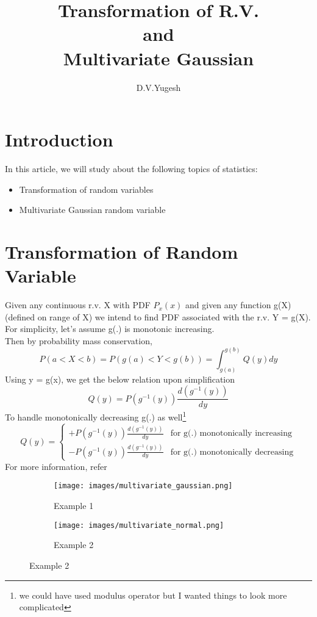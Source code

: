\documentclass{article}
\title{Transformation of R.V. \\ and \\ Multivariate Gaussian}
\author{D.V.Yugesh}
\date{}
\begin{document}
\maketitle
\tableofcontents
\clearpage
\section{Introduction}
In this article, we will study about the following topics of statistics:
\begin{itemize}
    \item Transformation of random variables
    \item Multivariate Gaussian random variable
\end{itemize}
\section{Transformation of Random Variable}
Given any continuous r.v. X with PDF $P_x(x)$ and given any function g(X)(defined on range of
X) we intend to find PDF associated with the r.v. Y = g(X). \\
For simplicity, let’s assume g(.) is monotonic increasing.\\
Then by probability mass conservation,
\[P(a<X<b)=P(g(a)<Y<g(b))=\int_{g(a)}^{g(b)}Q(y)dy\]
Using y = g(x), we get the below relation upon simplification
\[Q(y)=P(g^{-1}(y))\frac{d(g^{-1}(y))}{dy}\]
To handle monotonically decreasing g(.) as well\footnote{we could have used modulus operator but I wanted things to look more complicated}
\begin{equation}
Q(y)=\begin{cases}
+P(g^{-1}(y))\frac{d(g^{-1}(y))}{dy}&\text{for g(.) monotonically increasing}\\
-P(g^{-1}(y))\frac{d(g^{-1}(y))}{dy}&\text{for g(.) monotonically decreasing}
\end{cases}
\end{equation}
For more information, refer\cite{1}
\begin{figure}[h!]
\centering
     \begin{subfigure}[b]{0.3\textwidth}
         \centering
         \texttt{[image: images/multivariate\_gaussian.png]}
         \caption{Example 1}
         \label{1a}
     \end{subfigure}
     \hfill
     \begin{subfigure}[b]{0.3\textwidth}
         \centering
         \texttt{[image: images/multivariate\_normal.png]}
         \caption{Example 2}
         \label{1b}
     \end{subfigure}
\end{figure}
\end{document}
